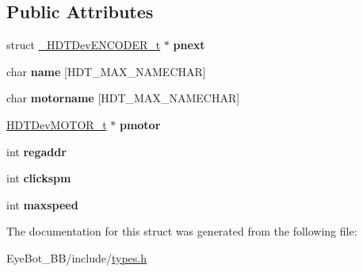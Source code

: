 \subsection*{\-Public \-Attributes}
\begin{DoxyCompactItemize}
\item 
\hypertarget{struct___h_d_t_dev_e_n_c_o_d_e_r__t_a686a81f3d8c391d9aec9e0f965cb00cd}{struct \hyperlink{struct___h_d_t_dev_e_n_c_o_d_e_r__t}{\-\_\-\-H\-D\-T\-Dev\-E\-N\-C\-O\-D\-E\-R\-\_\-t} $\ast$ {\bfseries pnext}}\label{struct___h_d_t_dev_e_n_c_o_d_e_r__t_a686a81f3d8c391d9aec9e0f965cb00cd}

\item 
\hypertarget{struct___h_d_t_dev_e_n_c_o_d_e_r__t_ae857f5896479d3c13e3cd291af9358db}{char {\bfseries name} \mbox{[}\-H\-D\-T\-\_\-\-M\-A\-X\-\_\-\-N\-A\-M\-E\-C\-H\-A\-R\mbox{]}}\label{struct___h_d_t_dev_e_n_c_o_d_e_r__t_ae857f5896479d3c13e3cd291af9358db}

\item 
\hypertarget{struct___h_d_t_dev_e_n_c_o_d_e_r__t_ac69742b0b6c8adc9b352a7c2c3b855d1}{char {\bfseries motorname} \mbox{[}\-H\-D\-T\-\_\-\-M\-A\-X\-\_\-\-N\-A\-M\-E\-C\-H\-A\-R\mbox{]}}\label{struct___h_d_t_dev_e_n_c_o_d_e_r__t_ac69742b0b6c8adc9b352a7c2c3b855d1}

\item 
\hypertarget{struct___h_d_t_dev_e_n_c_o_d_e_r__t_a55fcc2cadcea9e8e4d456550faf80f3a}{\hyperlink{struct___h_d_t_dev_m_o_t_o_r__t}{\-H\-D\-T\-Dev\-M\-O\-T\-O\-R\-\_\-t} $\ast$ {\bfseries pmotor}}\label{struct___h_d_t_dev_e_n_c_o_d_e_r__t_a55fcc2cadcea9e8e4d456550faf80f3a}

\item 
\hypertarget{struct___h_d_t_dev_e_n_c_o_d_e_r__t_af9b8da65714726cc5fa23c352d62b98b}{int {\bfseries regaddr}}\label{struct___h_d_t_dev_e_n_c_o_d_e_r__t_af9b8da65714726cc5fa23c352d62b98b}

\item 
\hypertarget{struct___h_d_t_dev_e_n_c_o_d_e_r__t_a7ae064677c28b044f1bfbcc2487e836d}{int {\bfseries clickspm}}\label{struct___h_d_t_dev_e_n_c_o_d_e_r__t_a7ae064677c28b044f1bfbcc2487e836d}

\item 
\hypertarget{struct___h_d_t_dev_e_n_c_o_d_e_r__t_abbaec474a2ab252a525be75642e496ae}{int {\bfseries maxspeed}}\label{struct___h_d_t_dev_e_n_c_o_d_e_r__t_abbaec474a2ab252a525be75642e496ae}

\end{DoxyCompactItemize}


\-The documentation for this struct was generated from the following file\-:\begin{DoxyCompactItemize}
\item 
\-Eye\-Bot\-\_\-\-B\-B/include/\hyperlink{types_8h}{types.\-h}\end{DoxyCompactItemize}
